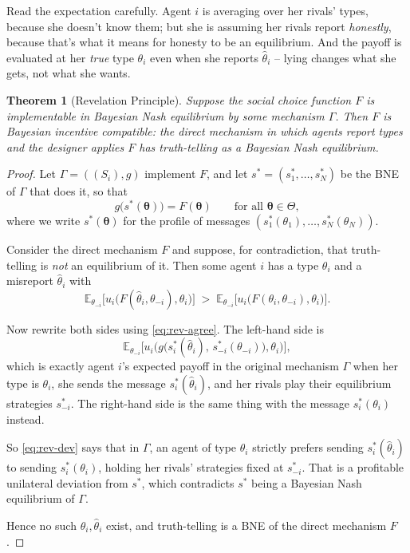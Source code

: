 \documentclass[12pt]{article}
\newcommand{\bbE}{\mathbb{E}}
\newtheorem{theorem}{Theorem}
\theoremstyle{definition}
\theoremstyle{remark}
\theoremstyle{plain}                          %
\newcommand{\Th}{\Theta}
\newcommand{\tv}{\boldsymbol{\theta}}
\begin{document}
\noindent Read the expectation carefully. Agent $i$ is averaging over her rivals' types, because she doesn't know them; but she is assuming her rivals report \emph{honestly}, because that's what it means for honesty to be an equilibrium. And the payoff is evaluated at her \emph{true} type $\theta_i$ even when she reports $\hat\theta_i$ -- lying changes what she gets, not what she wants.
 
\begin{theorem}[Revelation Principle]\label{thm:revelation}
Suppose the social choice function $F$ is implementable in Bayesian Nash equilibrium by some mechanism $\Gamma$. Then $F$ is Bayesian incentive compatible: the direct mechanism in which agents report types and the designer applies $F$ has truth-telling as a Bayesian Nash equilibrium.
\end{theorem}
 
\begin{proof}
Let $\Gamma = ((S_i), g)$ implement $F$, and let $s^* = (s_1^*,\dots,s_N^*)$ be the BNE of $\Gamma$ that does it, so that
\begin{equation}\label{eq:rev-agree}
    g\big(s^*(\tv)\big) = F(\tv) \qquad \text{for all } \tv \in \Th,
\end{equation}
where we write $s^*(\tv)$ for the profile of messages $(s_1^*(\theta_1),\dots,s_N^*(\theta_N))$.
 
Consider the direct mechanism $F$ and suppose, for contradiction, that truth-telling is \emph{not} an equilibrium of it. Then some agent $i$ has a type $\theta_i$ and a misreport $\hat\theta_i$ with
\begin{equation}\label{eq:rev-dev}
    \bbE_{\theta_{-i}}\Big[u_i\big(F(\hat\theta_i,\theta_{-i}),\theta_i\big)\Big]
    \;>\;
    \bbE_{\theta_{-i}}\Big[u_i\big(F(\theta_i,\theta_{-i}),\theta_i\big)\Big].
\end{equation}
 
Now rewrite both sides using \eqref{eq:rev-agree}. The left-hand side is
\[
    \bbE_{\theta_{-i}}\Big[u_i\big(g\big(s_i^*(\hat\theta_i),\, s_{-i}^*(\theta_{-i})\big),\theta_i\big)\Big],
\]
which is exactly agent $i$'s expected payoff in the original mechanism $\Gamma$ when her type is $\theta_i$, she sends the message $s_i^*(\hat\theta_i)$, and her rivals play their equilibrium strategies $s_{-i}^*$. The right-hand side is the same thing with the message $s_i^*(\theta_i)$ instead.
 
So \eqref{eq:rev-dev} says that in $\Gamma$, an agent of type $\theta_i$ strictly prefers sending $s_i^*(\hat\theta_i)$ to sending $s_i^*(\theta_i)$, holding her rivals' strategies fixed at $s_{-i}^*$. That is a profitable unilateral deviation from $s^*$, which contradicts $s^*$ being a Bayesian Nash equilibrium of $\Gamma$.
 
Hence no such $\theta_i, \hat\theta_i$ exist, and truth-telling is a BNE of the direct mechanism $F$.
\end{proof}
 
\end{document}
